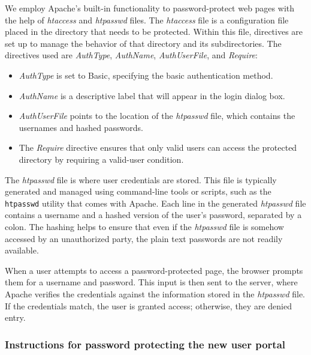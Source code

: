 We employ Apache's built-in functionality to password-protect web pages with the
help of \textit{htaccess} and \textit{htpasswd} files. The \textit{htaccess}
file is a configuration file placed in the directory that needs to be protected.
Within this file, directives are set up to manage the behavior of that directory
and its subdirectories. The directives used are \textit{AuthType},
\textit{AuthName}, \textit{AuthUserFile}, and \textit{Require}: 

\begin{itemize}
	\item \textit{AuthType} is set to Basic, specifying the basic authentication
    method. 
    \item \textit{AuthName} is a descriptive label that will appear in the
    login dialog box.
    \item \textit{AuthUserFile} points to the location of the \textit{htpasswd}
    file, which contains the usernames and hashed passwords. 
    \item The \textit{Require} directive ensures that only valid users can
    access the protected directory by requiring a valid-user condition.
\end{itemize}

The \textit{htpasswd} file is where user credentials are stored. This file is
typically generated and managed using command-line tools or scripts, such as the
\texttt{htpasswd} utility that comes with Apache. Each line in the generated
\textit{htpasswd} file contains a username and a hashed version of the user's
password, separated by a colon. The hashing helps to ensure that even if the
\textit{htpasswd} file is somehow accessed by an unauthorized party, the plain
text passwords are not readily available.

When a user attempts to access a password-protected page, the browser prompts
them for a username and password. This input is then sent to the server, where
Apache verifies the credentials against the information stored in the
\textit{htpasswd} file. If the credentials match, the user is granted access;
otherwise, they are denied entry.

\subsubsection*{Instructions for password protecting the new user portal}

